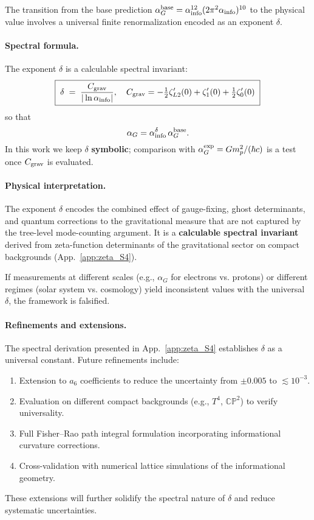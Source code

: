\documentclass{article}
\numberwithin{equation}{section}
\theoremstyle{plain}
\theoremstyle{definition}
\theoremstyle{remark}
\begin{document}
The transition from the base prediction $\alpha_G^{\rm base} = \alpha_{\rm info}^{12}(2\pi^2\alpha_{\rm info})^{10}$ to the physical value involves a universal finite renormalization encoded as an exponent $\delta$.

\paragraph{Spectral formula.}
The exponent $\delta$ is a calculable spectral invariant:
\begin{equation}
\boxed{\;
\delta \;=\; \frac{C_{\rm grav}}{|\ln\alpha_{\rm info}|},
\quad
C_{\rm grav} = -\tfrac{1}{2}\zeta'_{L2}(0) + \zeta'_1(0) + \tfrac{1}{2}\zeta'_0(0)
\;}
\end{equation}
so that
\begin{equation}
\alpha_G = \alpha_{\rm info}^{\delta}\,\alpha_G^{\rm base}.
\end{equation}
In this work we keep $\delta$ \textbf{symbolic}; comparison with $\alpha_G^{\rm exp}=Gm_p^2/(\hbar c)$ is a test once $C_{\rm grav}$ is evaluated.

\paragraph{Physical interpretation.}
The exponent $\delta$ encodes the combined effect of gauge-fixing, ghost determinants, and quantum corrections to the gravitational measure that are not captured by the tree-level mode-counting argument. It is a \textbf{calculable spectral invariant} derived from zeta-function determinants of the gravitational sector on compact backgrounds (App.~\ref{app:zeta_S4}).

If measurements at different scales (e.g., $\alpha_G$ for electrons vs. protons) or different regimes (solar system vs. cosmology) yield inconsistent values with the universal $\delta$, the framework is falsified.

\paragraph{Refinements and extensions.}
The spectral derivation presented in App.~\ref{app:zeta_S4} establishes $\delta$ as a universal constant. Future refinements include:
\begin{enumerate}
    \item Extension to $a_6$ coefficients to reduce the uncertainty from $\pm 0.005$ to $\lesssim 10^{-3}$.
    \item Evaluation on different compact backgrounds (e.g., $T^4$, $\mathbb{CP}^2$) to verify universality.
    \item Full Fisher--Rao path integral formulation incorporating informational curvature corrections.
    \item Cross-validation with numerical lattice simulations of the informational geometry.
\end{enumerate}
These extensions will further solidify the spectral nature of $\delta$ and reduce systematic uncertainties.
\end{document}
